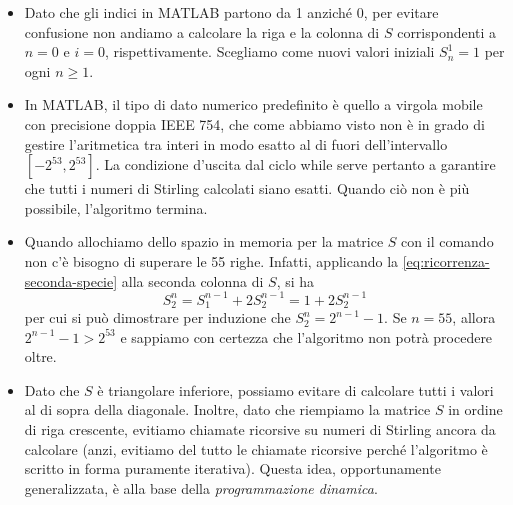 \begin{itemize}
\item Dato che gli indici in MATLAB partono da 1 anziché 0,
	per evitare confusione non andiamo a calcolare la riga
	e la colonna di $S$ corrispondenti a $n = 0$ e $i = 0$, rispettivamente.
	Scegliamo come nuovi valori iniziali $S_n^1 = 1$ per ogni $n \geq 1$.
\item In MATLAB, il tipo di dato numerico predefinito è quello a virgola
	mobile con precisione doppia IEEE 754, che come abbiamo visto
	non è in grado di gestire l'aritmetica tra interi in modo esatto
	al di fuori dell'intervallo $[-2^{53},2^{53}]$.
	La condizione d'uscita dal ciclo while serve pertanto a garantire
	che tutti i numeri di Stirling calcolati siano esatti.
	Quando ciò non è più possibile, l'algoritmo termina.
\item Quando allochiamo dello spazio in memoria per la matrice $S$
	con il comando  non c'è bisogno di superare le 55 righe.
	Infatti, applicando la \eqref{eq:ricorrenza-seconda-specie}
	alla seconda colonna di $S$, si ha
	\[
	S_2^n = S_1^{n-1} + 2S_2^{n-1} = 1 + 2S_2^{n-1}
	\]
	per cui si può dimostrare per induzione che $S_2^n = 2^{n-1}-1$.
	Se $n=55$, allora $2^{n-1} - 1 > 2^{53}$ e sappiamo con certezza
	che l'algoritmo non potrà procedere oltre.
\item Dato che $S$ è triangolare inferiore, possiamo evitare di calcolare
	tutti i valori al di sopra della diagonale. Inoltre, dato che riempiamo
	la matrice $S$ in ordine di riga crescente, evitiamo chiamate ricorsive
	su numeri di Stirling ancora da calcolare (anzi, evitiamo del tutto
	le chiamate ricorsive perché l'algoritmo è scritto in forma puramente
	iterativa). Questa idea, opportunamente generalizzata, è alla base
	della \emph{programmazione dinamica}.
\end{itemize}










